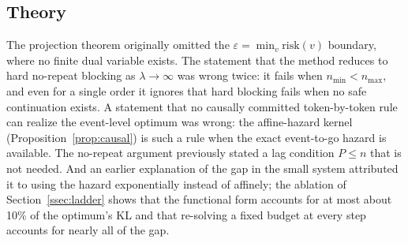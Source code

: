 \documentclass[make,article,submit,pdftex]{Definitions/mdpi}
\newcommand{\risk}{\mathrm{risk}}
\begin{document}
\subsection*{Theory}
The projection theorem originally omitted the $\varepsilon=\min_v\risk(v)$ boundary, where no finite dual variable exists. The statement that the method reduces to hard no-repeat blocking as $\lambda\to\infty$ was wrong twice: it fails when $n_{\min}<n_{\max}$, and even for a single order it ignores that hard blocking fails when no safe continuation exists. A statement that no causally committed token-by-token rule can realize the event-level optimum was wrong: the affine-hazard kernel (Proposition~\ref{prop:causal}) is such a rule when the exact event-to-go hazard is available. The no-repeat argument previously stated a lag condition $P\le n$ that is not needed. And an earlier explanation of the gap in the small system attributed it to using the hazard exponentially instead of affinely; the ablation of Section~\ref{ssec:ladder} shows that the functional form accounts for at most about 10\% of the optimum's KL and that re-solving a fixed budget at every step accounts for nearly all of the gap.
\end{document}
